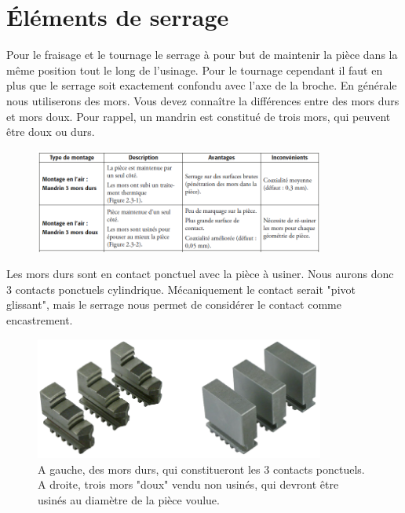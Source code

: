 \documentclass[
	11pt, %
	fleqn, %
	a4paper, %
]{LegrandOrangeBook}
\begin{document}
\section{Éléments de serrage}
Pour le fraisage et le tournage le serrage à pour but de maintenir la pièce dans la même position tout le long de l'usinage. Pour le tournage cependant il faut en plus que le serrage soit exactement confondu avec l'axe de la broche. En générale nous utiliserons des mors. Vous devez connaître la différences entre des mors durs et mors doux. Pour rappel, un mandrin est constitué de trois mors, qui peuvent être doux ou durs.
\begin{figure}[H] %
	\centering %
	\includegraphics[width=0.85\textwidth]{Images/M1.png} %

	\label{fig:placeholder} %
\end{figure}

Les mors durs sont en contact ponctuel avec la pièce à usiner. Nous aurons donc 3 contacts ponctuels cylindrique. Mécaniquement le contact serait "pivot glissant", mais le serrage nous permet de considérer le contact comme encastrement.
\begin{figure}[H] %
	\centering %
	\includegraphics[width=0.85\textwidth]{Images/M2.png} %
    \caption{A gauche, des mors durs, qui constitueront les 3 contacts ponctuels. A droite, trois mors "doux" vendu non usinés, qui devront être usinés au diamètre de la pièce voulue.}

	\label{fig:placeholder} %
\end{figure}
\end{document}
